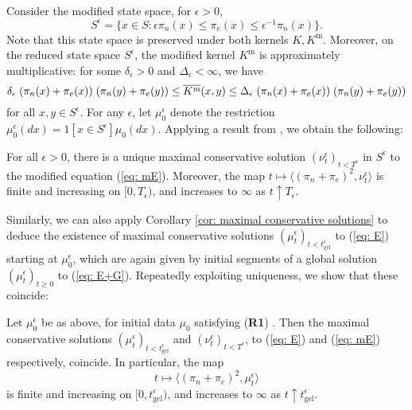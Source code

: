 Consider the modified state space, for $\epsilon>0$, \begin{equation*}
    S^\epsilon= \{x\in S: \epsilon \pi_n(x) \leq \pi_e(x) \leq \epsilon^{-1} \pi_n(x)\}.
\end{equation*} Note that this state space is preserved under both kernels $K, K^\text{m}$. Moreover, on the reduced state space $S^\epsilon$, the modified kernel $K^\text{m}$ is approximately multiplicative: for some $\delta_\epsilon>0$ and $\Delta_\epsilon<\infty$, we have \begin{equation*}
    \delta_\epsilon\hspace{0.1cm} (\pi_n(x)+\pi_e(x))\hspace{0.1cm}(\pi_n(y)+\pi_e(y)) \leq \overline{K^\text{m}}(x,y) \leq  \Delta_\epsilon\hspace{0.1cm} (\pi_n(x)+\pi_e(x))\hspace{0.1cm}(\pi_n(y)+\pi_e(y))
\end{equation*}for all $x,y \in S^\epsilon$. For any $\epsilon$, let $\mu_0^\epsilon$ denote the restriction $\mu_0^\epsilon(dx)=1[x\in S^\epsilon]\mu_0(dx).$ Applying a result from  \cite{N00}, we obtain the following:
\begin{lemma}\label{lemma: solution to modified equation}
    For all $\epsilon>0$, there is a unique maximal conservative solution  $(\nu^\epsilon_t)_{t< T^\epsilon}$ in $S^\epsilon$ to the modified equation (\ref{eq: mE}). Moreover, the map $t\mapsto \langle (\pi_n+\pi_e)^2, \nu^\epsilon_t\rangle$ is finite and increasing on $[0,T_\epsilon)$, and increases to $\infty$ as $t\uparrow T_\epsilon$. 
\end{lemma}

Similarly, we can also apply Corollary \ref{cor: maximal conservative solutions} to deduce the existence of maximal conservative solutions $(\mu^\epsilon_t)_{t<t_\text{gel}^\epsilon}$ to (\ref{eq: E}) starting at $\mu^\epsilon_0$, which are again given by initial segments of a global solution $(\mu^\epsilon_t)_{t\geq 0}$ to (\ref{eq: E+G}). Repeatedly exploiting uniqueness, we show that these coincide:

\begin{lemma} Let $\mu^\epsilon_0$ be as above, for initial data $\mu_0$ satisfying (\textbf{R1}) . Then the maximal conservative solutions $(\mu^\epsilon_t)_{t<t_\text{gel}^\epsilon}$ and $(\nu^\epsilon_t)_{t<T^\epsilon}$, to (\ref{eq: E}) and (\ref{eq: mE}) respectively, coincide. In particular, the map \begin{equation*}
    t\mapsto \langle (\pi_n+\pi_e)^2, \mu^\epsilon_t\rangle
\end{equation*} is finite and increasing on $[0, t_\text{gel}^\epsilon)$, and increases to $\infty$ as $t\uparrow t_\text{gel}^\epsilon.$ \end{lemma}

